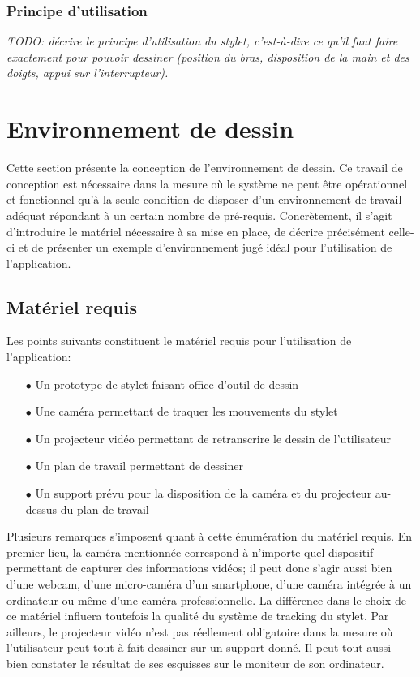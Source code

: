 \documentclass[11pt,a4paper,oldfontcommands]{memoir}
\begin{document}
\subsubsection{Principe d'utilisation}

\textit{TODO: décrire le principe d'utilisation du stylet, c'est-à-dire ce qu'il faut faire exactement pour pouvoir dessiner (position du bras, disposition de la main et des doigts, appui sur l'interrupteur).}

\newpage

\section{Environnement de dessin}

Cette section présente la conception de l'environnement de dessin. Ce travail de conception est nécessaire dans la mesure où le système ne peut être opérationnel et fonctionnel qu'à la seule condition de disposer d'un environnement de travail adéquat répondant à un certain nombre de pré-requis. Concrètement, il s'agit d'introduire le matériel nécessaire à sa mise en place, de décrire précisément celle-ci et de présenter un exemple d'environnement jugé idéal pour l'utilisation de l'application.

\subsection{Matériel requis}

Les points suivants constituent le matériel requis pour l'utilisation de l'application:

\begin{itemize}
\item[$\bullet$] Un prototype de stylet faisant office d'outil de dessin
\item[$\bullet$] Une caméra permettant de traquer les mouvements du stylet
\item[$\bullet$] Un projecteur vidéo permettant de retranscrire le dessin de l'utilisateur
\item[$\bullet$] Un plan de travail permettant de dessiner
\item[$\bullet$] Un support prévu pour la disposition de la caméra et du projecteur au-dessus du plan de travail
\end{itemize}

Plusieurs remarques s'imposent quant à cette énumération du matériel requis. En premier lieu, la caméra mentionnée correspond à n'importe quel dispositif permettant de capturer des informations vidéos; il peut donc s'agir aussi bien d'une webcam, d'une micro-caméra d'un smartphone, d'une caméra intégrée à un ordinateur ou même d'une caméra professionnelle. La différence dans le choix de ce matériel influera toutefois la qualité du système de tracking du stylet. Par ailleurs, le projecteur vidéo n'est pas réellement obligatoire dans la mesure où l'utilisateur peut tout à fait dessiner sur un support donné. Il peut tout aussi bien constater le résultat de ses esquisses sur le moniteur de son ordinateur.
\end{document}
